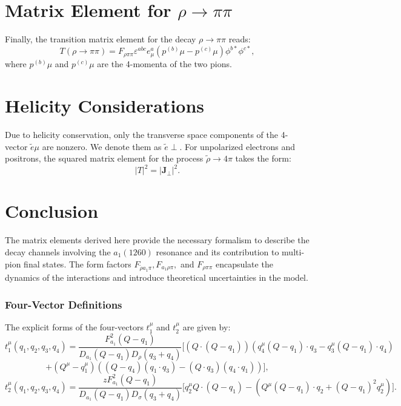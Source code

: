 \documentclass[12pt]{article}
\begin{document}
\section{Matrix Element for $\rho \to \pi\pi$}
Finally, the transition matrix element for the decay $\rho \to \pi\pi$ reads:
\begin{equation}
T(\rho \to \pi\pi) = F_{\rho \pi \pi} \varepsilon^{abc} e^a_\mu (p^{(b)}\mu - p^{(c)}\mu) \phi^{b*} \phi^{c*},
\end{equation}
where $p^{(b)}\mu$ and $p^{(c)}\mu$ are the 4-momenta of the two pions.

\section{Helicity Considerations}
Due to helicity conservation, only the transverse space components of the 4-vector $\tilde{e}\mu$ are nonzero. We denote them as $\tilde{e}\perp$. For unpolarized electrons and positrons, the squared matrix element for the process $\tilde{\rho} \to 4\pi$ takes the form:
\begin{equation}
|T|^2 = |\mathbf{J}_\perp|^2.
\end{equation}

\section{Conclusion}
The matrix elements derived here provide the necessary formalism to describe the decay channels involving the $a_1(1260)$ resonance and its contribution to multi-pion final states. The form factors $F_{\tilde{\rho} a_1 \pi}, F_{a_1 \rho \pi},$ and $F_{\rho \pi \pi}$ encapsulate the dynamics of the interactions and introduce theoretical uncertainties in the model.


\subsubsection*{Four-Vector Definitions}
The explicit forms of the four-vectors $t_1^\mu$ and $t_2^\mu$ are given by:
\begin{equation}
t_1^\mu(q_1, q_2, q_3, q_4) = \frac{F^2_{a_1} (Q - q_1)}{D_{a_1}(Q - q_1) D_\rho(q_3 + q_4)} \Big[ (Q \cdot (Q - q_1)) (q_4^\mu (Q - q_1) \cdot q_3 - q_3^\mu (Q - q_1) \cdot q_4)
\end{equation}
\begin{equation}
+ (Q^\mu - q_1^\mu)((Q - q_4)(q_1 \cdot q_3) - (Q \cdot q_3)(q_4 \cdot q_1)) \Big],
\end{equation}
\begin{equation}
t_2^\mu(q_1, q_2, q_3, q_4) = \frac{zF^2_{a_1} (Q - q_1)}{D_{a_1}(Q - q_1) D_\sigma(q_3 + q_4)} \Big[ q_2^\mu Q \cdot (Q - q_1) - (Q^\mu (Q - q_1) \cdot q_2 + (Q - q_1)^2 q_2^\mu) \Big].
\end{equation}
\end{document}
